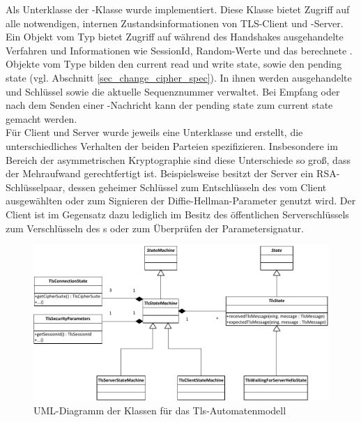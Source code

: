 Als Unterklasse der -Klasse wurde  implementiert. Diese Klasse bietet Zugriff auf alle notwendigen, internen Zustandsinformationen von TLS-Client und -Server. Ein Objekt vom Typ  bietet Zugriff auf während des Handshakes ausgehandelte Verfahren und Informationen wie SessionId, Random-Werte und das berechnete \mastersecret{}. Objekte vom Type  bilden den current read und write state, sowie den pending state (vgl. Abschnitt \ref{sec_change_cipher_spec}). In ihnen werden ausgehandelte \ciphersuite{} und Schlüssel sowie die aktuelle Sequenznummer verwaltet. Bei Empfang oder nach dem Senden einer \changecipherspec{}-Nachricht kann der pending state zum current state gemacht werden.\\
Für Client und Server wurde jeweils eine Unterklasse  und  erstellt, die unterschiedliches Verhalten der beiden Parteien spezifizieren. Insbesondere im Bereich der asymmetrischen Kryptographie sind diese Unterschiede so groß, dass der Mehraufwand gerechtfertigt ist. Beispielsweise besitzt der Server ein RSA-Schlüsselpaar, dessen geheimer Schlüssel zum Entschlüsseln des vom Client ausgewählten \premastersecret{} oder zum Signieren der Diffie-Hellman-Parameter genutzt wird. Der Client ist im Gegensatz dazu lediglich im Besitz des öffentlichen Serverschlüssels zum Verschlüsseln des \premastersecret{}s oder zum Überprüfen der Parametersignatur.

\begin{figure}
	\centering
	\includegraphics[scale=0.9]{Diagrams/uml/tls_state_machine.pdf} 
	\caption{UML-Diagramm der Klassen für das Tls-Automatenmodell}
	\label{fig_uml_tls_state_machine}
\end{figure}

